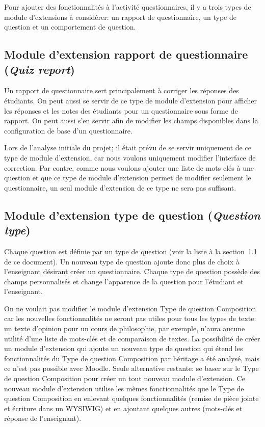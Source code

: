 Pour ajouter des fonctionnalités à l'activité questionnaires, il y a trois types de module d'extensions à considérer: un rapport de questionnaire, un type de question et un comportement de question.

\subsection{Module d'extension rapport de questionnaire (\textit{Quiz report})}

Un rapport de questionnaire sert principalement à corriger les réponses des étudiants.
On peut aussi se servir de ce type de module d'extension pour afficher les réponses et les notes des étudiants pour un questionnaire sous forme de rapport.
On peut aussi s'en servir afin de modifier les champs disponibles dans la configuration de base d'un questionnaire.

Lors de l'analyse initiale du projet; il était prévu de se servir uniquement de ce type de module d'extension, car nous voulons uniquement modifier l'interface de correction.
Par contre, comme nous voulons ajouter une liste de mots clés à une question et que ce type de module d'extension permet de modifier seulement le questionnaire, un seul module d'extension de ce type ne sera pas suffisant.

\subsection{Module d'extension type de question (\textit{Question type})}

Chaque question est définie par un type de question (voir la liste à la section~1.1 de ce document).
Un nouveau type de question ajoute donc plus de choix à l'enseignant désirant créer un questionnaire.
Chaque type de question possède des champs personnalisés et change l'apparence de la question pour l'étudiant et l'enseignant.

On ne voulait pas modifier le module d'extension \og Type de question Composition \fg{} car les nouvelles fonctionnalités ne seront pas utiles pour tous les types de texte: un texte d'opinion pour un cours de philosophie, par exemple, n'aura aucune utilité d'une liste de mots-clés et de comparaison de textes.
La possibilité de créer un module d'extension qui ajoute un nouveau type de question qui étend les fonctionnalités du \og Type de question Composition \fg{} par héritage a été analysé, mais ce n'est pas possible avec Moodle.
Seule alternative restante: se baser sur le \og Type de question Composition \fg{} pour créer un tout nouveau module d'extension.
Ce nouveau module d'extension utilise les mêmes fonctionnalités que le \og Type de question Composition \fg{} en enlevant quelques fonctionnalités (remise de pièce jointe et écriture dans un WYSIWIG) et en ajoutant quelques autres (mots-clés et réponse de l'enseignant).

